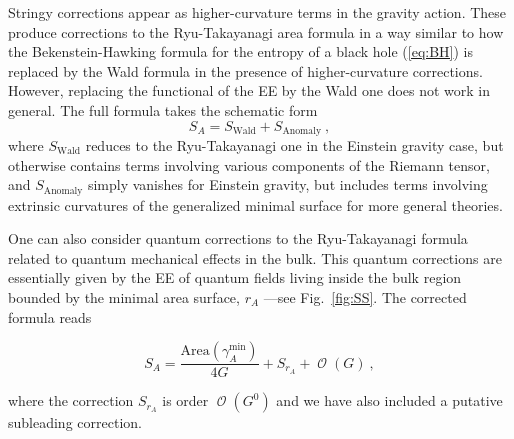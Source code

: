\documentclass[twocolumn]{revtex4}
\providecommand{\eq}[2]{
    \begin{equation}
        #2
    \label{eq:#1}
    \end{equation}
}
\DeclareMathOperator{\calO}{\mathcal{O}}
\begin{document}
Stringy corrections appear as higher-curvature terms in the gravity action. These produce corrections to the Ryu-Takayanagi area formula in a way similar to 
how the Bekenstein-Hawking formula for the entropy of a black hole (\ref{eq:BH}) is replaced by the Wald formula \cite{iyer_properties_1994} in the presence of higher-curvature corrections. However, replacing the functional of the EE by the Wald one does not work in general. The full formula takes the schematic form \cite{dong_holographic_2014}
\begin{equation}\label{hee}
    S_A=S_{\text{Wald}}+ S_{\text{Anomaly}} \ ,
\end{equation}
where $S_{\text{Wald}}$ reduces to the Ryu-Takayanagi one in the Einstein gravity case, but otherwise contains terms involving various components of the Riemann tensor, and $S_{\text{Anomaly}}$ simply vanishes for Einstein gravity, but includes terms involving extrinsic curvatures of the generalized minimal surface for more general theories. %



One can also consider quantum corrections to the Ryu-Takayanagi formula related to quantum mechanical effects in the bulk. This quantum corrections are essentially given by the EE of quantum fields living inside the bulk region bounded by the minimal area surface, $r_A$ ---see Fig.~\ref{fig:SS}. The corrected formula reads \cite{faulkner_quantum_2013}
\eq{EEquantum}{
    S_A = \frac{\text{Area} (\gamma_A^\text{min})}{4 G} + S_{r_A} + \calO(G) \ ,
}
where the correction $S_{r_A}$ is order $\calO(G^0)$ and we have also included a putative subleading correction.
\end{document}
